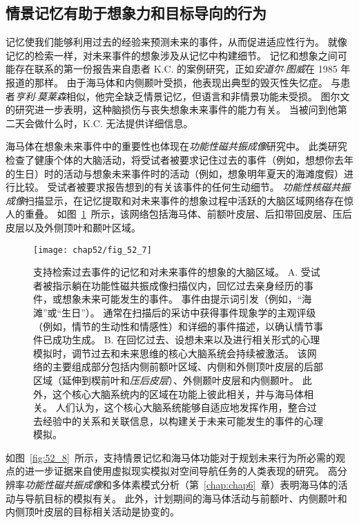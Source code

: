\subsection{情景记忆有助于想象力和目标导向的行为}

记忆使我们能够利用过去的经验来预测未来的事件，从而促进适应性行为。
就像记忆的检索一样，对未来事件的想象涉及从记忆中构建细节。
记忆和想象之间可能存在联系的第一份报告来自患者 K.C. 的案例研究，正如\textit{安道尔$\cdot$图威}在 1985 年报道的那样。
由于海马体和内侧颞叶受损，他表现出典型的毁灭性失忆症。
与患者\textit{亨利$\cdot$莫莱森}相似，他完全缺乏情景记忆，但语言和非情景功能未受损。
图尔文的研究进一步表明，这种脑损伤与丧失想象未来事件的能力有关。
当被问到他第二天会做什么时，K.C. 无法提供详细信息。


海马体在想象未来事件中的重要性也体现在\textit{功能性磁共振成像}研究中。
此类研究检查了健康个体的大脑活动，将受试者被要求记住过去的事件（例如，想想你去年的生日）时的活动与想象未来事件时的活动（例如，想象明年夏天的海滩度假）进行比较。
受试者被要求报告想到的有关该事件的任何生动细节。
\textit{功能性核磁共振成像}扫描显示，在记忆提取和对未来事件的想象过程中活跃的大脑区域网络存在惊人的重叠。
如图~\ref{fig:52_7}~所示，该网络包括海马体、前额叶皮层、后扣带回皮层、压后皮层以及外侧顶叶和颞叶区域。


\begin{figure}[htbp]
	\centering
	\texttt{[image: chap52/fig\_52\_7]}
	\caption{支持检索过去事件的记忆和对未来事件的想象的大脑区域\cite{schacter2017episodic}。
		A. 受试者被指示躺在功能性磁共振成像扫描仪内，回忆过去亲身经历的事件，或想象未来可能发生的事件。
		事件由提示词引发（例如，“海滩”或“生日”）。
		通常在扫描后的采访中获得事件现象学的主观评级（例如，情节的生动性和情感性）和详细的事件描述，以确认情节事件已成功生成。
		B. 在回忆过去、设想未来以及进行相关形式的心理模拟时，调节过去和未来思维的核心大脑系统会持续被激活。
		该网络的主要组成部分包括内侧前额叶区域、内侧和外侧顶叶皮层的后部区域（延伸到楔前叶和\textit{压后皮层}）、外侧颞叶皮层和内侧颞叶。
		此外，这个核心大脑系统内的区域在功能上彼此相关，并与海马体相关。
		人们认为，这个核心大脑系统能够自适应地发挥作用，整合过去经验中的关系和关联信息，以构建关于未来可能发生的事件的心理模拟。}
	\label{fig:52_7}
\end{figure}


如图~\ref{fig:52_8}~所示，支持情景记忆和海马体功能对于规划未来行为所必需的观点的进一步证据来自使用虚拟现实模拟对空间导航任务的人类表现的研究。
高分辨率\textit{功能性磁共振成像}和多体素模式分析（第~\ref{chap:chap6}~章）表明海马体的活动与导航目标的模拟有关。
此外，计划期间的海马体活动与前额叶、内侧颞叶和内侧顶叶皮层的目标相关活动是协变的。


